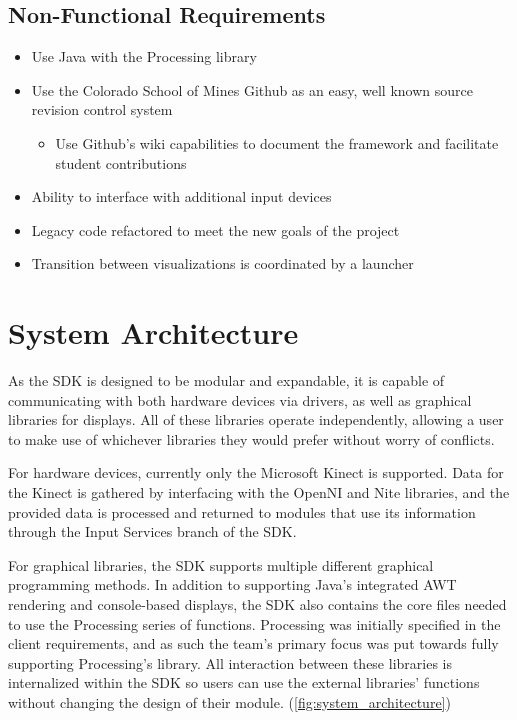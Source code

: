\documentclass[11pt,letterpaper]{article}
\begin{document}
	\subsection{Non-Functional Requirements}
	\begin{itemize}
		\item Use Java with the Processing library
		\item Use the Colorado School of Mines Github as an easy, well known source revision control system
		\begin{itemize}
			\item Use Github's wiki capabilities to document the framework and facilitate student contributions
		\end{itemize}
		\item Ability to interface with additional input devices
		\item Legacy code refactored to meet the new goals of the project
		\item Transition between visualizations is coordinated by a launcher
	\end{itemize}
	\pagebreak

	\section{System Architecture}
	As the SDK is designed to be modular and expandable, it is capable of 
	communicating with both hardware devices via drivers, as well as graphical 
	libraries for displays. All of these libraries operate independently, 
	allowing a user to make use of whichever libraries they would prefer 
	without worry of conflicts. 

	For hardware devices, currently only the Microsoft Kinect is supported. 
	Data for the Kinect is gathered by interfacing with the OpenNI and Nite 
	libraries, and the provided data is processed and returned to modules that 
	use its information through the Input Services branch of the SDK. 

	For graphical libraries, the SDK supports multiple different graphical 
	programming methods. In addition to supporting Java's integrated AWT 
	rendering and console-based displays, the SDK also contains the core files 
	needed to use the Processing series of functions. Processing was initially 
	specified in the client requirements, and as such the team's primary focus 
	was put towards fully supporting Processing's library. All interaction 
	between these libraries is internalized within the SDK so users can use 
	the external libraries' functions without changing the design of their module. 
	(\autoref{fig:system_architecture})
	\pagebreak
   
\end{document}
